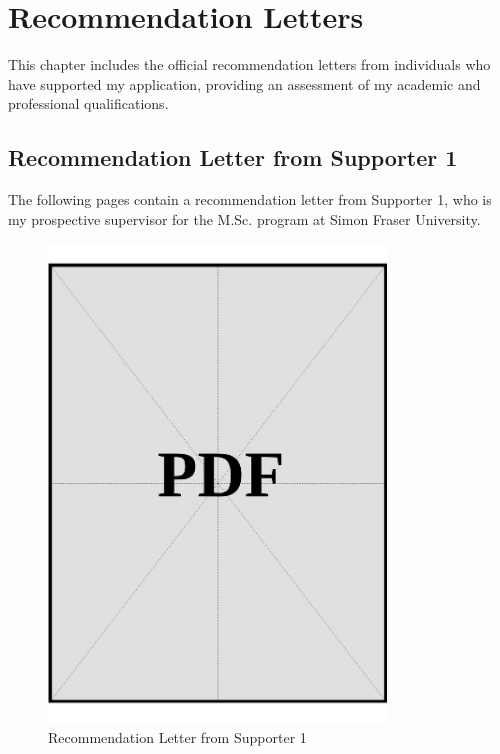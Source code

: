 
\chapter{Recommendation Letters}\label{sec:recommendation-letters}

This chapter includes the official recommendation letters from individuals who have supported my application, providing an assessment of my academic and professional qualifications.

\clearpage
\section{Recommendation Letter from Supporter 1}\label{sec:recommendation-letter-1}

The following pages contain a recommendation letter from Supporter 1, who is my prospective supervisor for the M.Sc. program at Simon Fraser University.

\begin{figure}[H]
    \centering
    \includegraphics[page=1, width=0.8\textwidth]{../application-docs/applicant/recommendation-letters/letter-1.pdf}
    \caption{Recommendation Letter from Supporter 1}
    \label{fig:recommendation-letter-1}
\end{figure}

